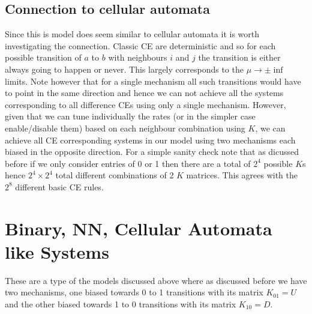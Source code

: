 \documentclass[11pt]{article}
\begin{document}
\subsection{Connection to cellular automata}
Since this is model does seem similar to cellular automata it is worth investigating the connection.
Classic CE are deterministic and so for each possible transition of $a$ to $b$ with neighbours $i$ and $j$ the transition is either always going to happen or never.
This largely corresponds to the $\mu \rightarrow \pm\inf$ limits.
Note however that for a single mechanism all such transitions would have to point in the same direction and hence we can not achieve all the systems corresponding to all difference CEs using only a single mechanism.
However, given that we can tune individually the rates (or in the simpler case enable/disable them) based on each neighbour combination using $K$, we can achieve all CE corresponding systems in our model using two mechanisms each biased in the opposite direction.
For a simple sanity check note that as dicussed before if we only consider entries of 0 or 1 then there are a total of $2^4$ possible $K$s hence $2^4\times2^4$ total different combinations of 2 $K$ matrices.
This agrees with the $2^8$ different basic CE rules.

\newpage
\section{Binary, NN, Cellular Automata like Systems}
These are a type of the models discussed above where as discussed before we have two mechanisms, one biased towards 0 to 1 transitions with its matrix $K_{01}=U$ and the other biased towards 1 to 0 transitions with its matrix $K_{10}=D$.
\end{document}
